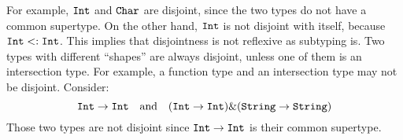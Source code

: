 For example, $\texttt{Int}$ and $\texttt{Char}$ are disjoint,
since the two types do not have a common supertype. On the other hand, $\texttt{Int}$ is not
disjoint with itself, because $\texttt{Int} <: \texttt{Int}$. This implies that
disjointness is not reflexive as subtyping is. Two types with different ``shapes''
are always disjoint, unless one of them is an intersection type.
For example, a function type and an intersection
type may not be disjoint. Consider:
\[ \texttt{Int} \to \texttt{Int} \quad \text{and} \quad (\texttt{Int} \to \texttt{Int}) \& (\texttt{String} \to \texttt{String}) \]
Those two types are not disjoint since $\texttt{Int} \to \texttt{Int}$ is their common supertype.


%
%
%
%

